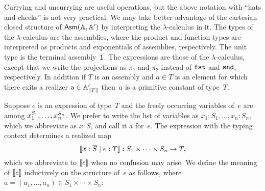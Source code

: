 Currying and uncurrying are useful operations, but the above notation
with ``hats and checks'' is not very practical. We may take better
advantage of the cartesian closed structure of $\mathsf{Asm}(\mathbb{A},\mathbb{A}')$ by interpreting
the $\lambda$-calculus in it. The types of the $\lambda$-calculus are
the assemblies, where the product and function types are interpreted
as products and exponentials of assemblies, respectively. The unit
type is the terminal assembly~$\mathsf{1}$. The expressions are those of the
$\lambda$-calculus, except that we write the projections as $\pi_1$
and $\pi_2$ instead of $\mathtt{fst}$ and $\mathtt{snd}$, respectively. In
addition if $T$ is an assembly and $a \in T$ is an element for
which there exits a realizer $\mathtt{a} \in \mathbb{A}'_{\|T\|}$ then~$a$ is a
primitive constant of type~$T$.

Suppose $e$ is an expression of type~$T$ and the freely
occurring variables of~$e$ are among $x_1^{S_1}, \ldots,
x_n^{S_n}$. We prefer to write the list of variables as
$x_1 : S_1, \ldots, x_n : S_n$, which we abbreviate as
$\overline{x} : \overline{S}$, and call it a  for~$e$. The expression with the typing context determines
a realized map
%
\begin{equation*}
  [\![\overline{x} : \overline{S} \mid e : T]\!] :
  S_1 \times \cdots \times S_n \to T,
\end{equation*}
%
which we abbreviate to $[\![e]\!]$ when no confusion may arise. We
define the meaning of $[\![e]\!]$ inductively on the structure of~$e$ as
follows, where $a = (a_1, \ldots, a_n) \in S_1 \times \cdots \times
S_n$:
%
